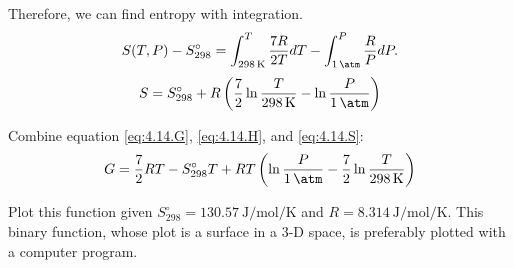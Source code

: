 \begin{@empty}
\begin{answer}
    Therefore, we can find entropy with integration.
    \[ S(T, P) - S_{298}^\circ = \int_{\SI{298}{\kelvin}}^T \frac{7R}{2T} dT - \int_{\SI{1}{\atm}}^P \frac{R}{P} dP.\]
    \begin{equation}
        S = S_{298}^\circ + R \left( \frac72 \ln\frac{T}{\SI{298}{\kelvin}} - \ln\frac{P}{\SI{1}{\atm}} \right)
        \label{eq:4.14.S}
    \end{equation}

    Combine equation \eqref{eq:4.14.G}, \eqref{eq:4.14.H}, and
    \eqref{eq:4.14.S}:
    \[ G = \frac72 RT - S_{298}^\circ T + RT \left( \ln\frac{P}{\SI{1}{\atm}} - \frac72 \ln\frac{T}{\SI{298}{\kelvin}} \right) \]

    Plot this function given $S_{298}^\circ = \SI{130.57}{\joule\per\mol\per\kelvin}$
    and $R = \SI{8.314}{\joule\per\mol\per\kelvin}$.  This binary function,
    whose plot is a surface in a 3-D space, is preferably plotted with a
    computer program.
\end{answer}
\end{@empty}
